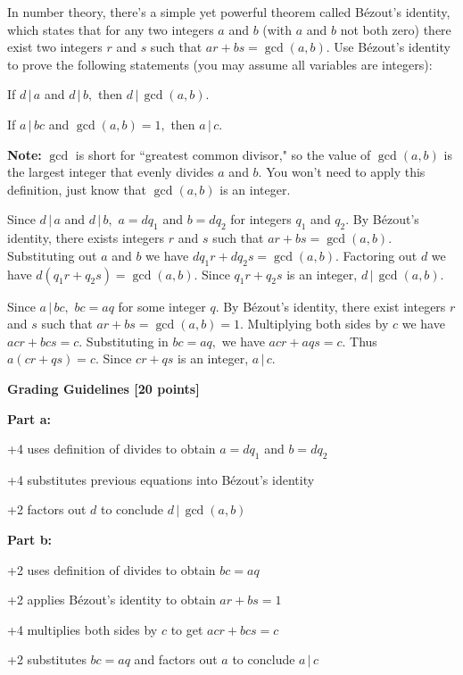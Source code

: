 \documentclass[12pt]{exam}
\newcommand{\divides}{\,|\,}
\begin{document}
In number theory, there's a simple yet powerful theorem called Bézout's identity, which states that for any two integers $a$ and $b$ (with $a$ and $b$ not both zero) there exist two integers $r$ and $s$ such that $ar+bs=\gcd(a,b).$ Use Bézout's identity to prove the following statements (you may assume all variables are integers):

\begin{qparts}
    \item If $d\divides a$ and $d\divides b,$ then $d\divides \gcd(a,b).$
    \item If $a\divides bc$ and $\gcd(a,b)=1,$ then $a\divides c.$
\end{qparts}

\noindent
\textbf{Note:} $\gcd$ is short for ``greatest common divisor," so the value of $\gcd(a,b)$ is the largest integer that evenly divides $a$ and $b.$ You won't need to apply this definition, just know that $\gcd(a,b)$ is an integer.


\begin{solution} 
\begin{qparts}
    \item Since $d\divides a$ and $d\divides b,$ $a=dq_1$ and $b=dq_2$ for integers $q_1$ and $q_2.$ By Bézout's identity, there exists integers $r$ and $s$ such that $ar+bs=\gcd(a,b).$ Substituting out $a$ and $b$ we have $dq_1r+dq_2s=\gcd(a,b).$ Factoring out $d$ we have $d(q_1r+q_2s)=\gcd(a,b).$ Since $q_1r+q_2s$ is an integer, $d\divides \gcd(a,b).$
    \item Since $a\divides bc,$ $bc=aq$ for some integer $q.$ By Bézout's identity, there exist integers $r$ and $s$ such that $ar+bs=\gcd(a,b)=1.$ Multiplying both sides by $c$ we have $acr+bcs=c.$ Substituting in $bc=aq,$ we have $acr+aqs=c.$ Thus $a(cr+qs)=c.$ Since $cr+qs$ is an integer, $a\divides c.$
\end{qparts}

\noindent
\textbf{Grading Guidelines [20 points]}

\textbf{Part a:}
\begin{gwguidelines}
    \item +4 uses definition of divides to obtain $a=dq_1$ and $b=dq_2$
    \item +4 substitutes previous equations into Bézout's identity
    \item +2 factors out $d$ to conclude $d\divides \gcd(a,b)$
\end{gwguidelines}
\textbf{Part b:}
\begin{gwguidelines}[resume]
    \item +2 uses definition of divides to obtain $bc=aq$
    \item +2 applies Bézout's identity to obtain $ar+bs=1$
    \item +4 multiplies both sides by $c$ to get $acr+bcs=c$
    \item +2 substitutes $bc=aq$ and factors out $a$ to conclude $a\divides c$
\end{gwguidelines}
\end{solution}
\end{document}

